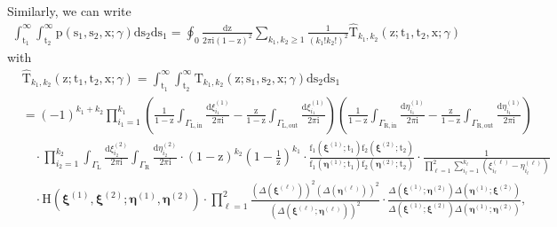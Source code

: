 \documentclass{article}
\numberwithin{equation}{section}
\newcommand{\ddbar}[2]{\frac{{\mathrm d}#1}{2\pi {\mathrm i}#2}}
\newcommand{\inn}{\mathrm{in}}
\newcommand{\limp}{\mathrm{p}}
\newcommand{\LL}{\mathrm{L}}
\newcommand{\out}{\mathrm{out}}
\newcommand{\RR}{\mathrm{R}}
\begin{document}
Similarly, we can write %
\begin{equation}
	\label{eq:right_vertical}
	\begin{split}
		\int_{\mathrm{t}_1}^\infty \int_{\mathrm{t}_2}^\infty\limp(\mathrm{s}_1,\mathrm{s}_2,\mathrm{x};\gamma)\mathrm{d}{\mathrm{s}_2}\mathrm{d}{\mathrm{s}_1}=\oint_0\ddbar{\mathrm{z}}{\mathrm{(1-z)^2}}\sum_{k_1,k_2\ge 1}
		\frac{1}{(k_1!k_2!)^2}
		\mathrm{\hat T}_{k_1,k_2}(\mathrm{z};\mathrm{t}_1,\mathrm{t}_2,\mathrm{x};\gamma)
	\end{split}
\end{equation}
with
\begin{equation}
	\label{eq:hat_rT}
	\begin{split}
		&\mathrm{\hat T}_{k_1,k_2}(\mathrm{z};\mathrm{t}_1,\mathrm{t}_2,\mathrm{x};\gamma)=\int_{\mathrm{t}_1}^\infty \int_{\mathrm{t}_2}^\infty\mathrm{ T}_{k_1,k_2}(\mathrm{z};\mathrm{s}_1,\mathrm{s}_2,\mathrm{x};\gamma)\mathrm{d}{\mathrm{s}_2}\mathrm{d}{\mathrm{s}_1}\\
		&=
		(-1)^{k_1+k_2}\prod_{i_1=1}^{k_1}     
		\left(  \frac{1}{1-\mathrm{z}} \int_{\Gamma_{\LL,\inn}} 	    
		\ddbar{\xi^{(1)}_{i_1}}{}   
		-\frac{\mathrm{z}}{1-\mathrm{z}} \int_{\Gamma_{\LL,\out}} \ddbar{\xi^{(1)}_{i_1}}{}
		\right)
		\left(  \frac{1}{1-\mathrm{z}}  \int_{\Gamma_{\RR,\inn}}  
		\ddbar{\eta^{(1)}_{i_1}}{}
		-\frac{\mathrm{z}}{1-\mathrm{z}}   \int_{\Gamma_{\RR,\out}}
		\ddbar{\eta^{(1)}_{i_1}}{}
		\right)
		\\
		&\quad \cdot 
		\prod_{i_2=1}^{k_2}  
		\int_{\Gamma_\LL} \ddbar{\xi^{(2)}_{i_2}}{} 
		\int_{\Gamma_\RR} \ddbar{\eta^{(2)}_{i_2}}{} 
		\cdot    
		\left(1-\mathrm{z}\right)^{k_2}
		\left(1-\frac{1}{\mathrm{z}}\right)^{k_1}
		\cdot 
		\frac
		{\mathrm{f}_1(\boldsymbol{\xi}^{(1)};\mathrm{t}_1)
			\mathrm{f}_2(\boldsymbol{\xi}^{(2)};\mathrm{t}_2)}
		{\mathrm{f}_1(\boldsymbol{\eta}^{(1)};\mathrm{t}_1)
			\mathrm{f}_2(\boldsymbol{\eta}^{(2)};\mathrm{t}_2)}
		\cdot
		\frac{1}{\prod_{\ell=1}^2\sum_{i_\ell=1}^{k_\ell}(\xi_{i_\ell}^{(\ell)} -\eta_{i_\ell}^{(\ell)})}
		\\
		&\quad \cdot
		\mathrm{H}(\boldsymbol{\xi}^{(1)},\boldsymbol{\xi}^{(2)};
		\boldsymbol{\eta}^{(1)},\boldsymbol{\eta}^{(2)}) \cdot 
		\prod_{\ell=1}^2
		\frac{\left( \Delta(\boldsymbol{\xi}^{(\ell)}) \right)^2
			\left( \Delta(\boldsymbol{\eta}^{(\ell)}) \right)^2
		}
		{\left( \Delta(\boldsymbol{\xi}^{(\ell)}; \boldsymbol{\eta}^{(\ell)}) \right)^2}
		\cdot 
		\frac{\Delta(\boldsymbol{\xi}^{(1)};\boldsymbol{\eta}^{(2)})
			\Delta(\boldsymbol{\eta}^{(1)};\boldsymbol{\xi}^{(2)})
		}
		{\Delta(\boldsymbol{\xi}^{(1)};\boldsymbol{\xi}^{(2)})
			\Delta(\boldsymbol{\eta}^{(1)};\boldsymbol{\eta}^{(2)})
		},
	\end{split}
\end{equation}
\end{document}
